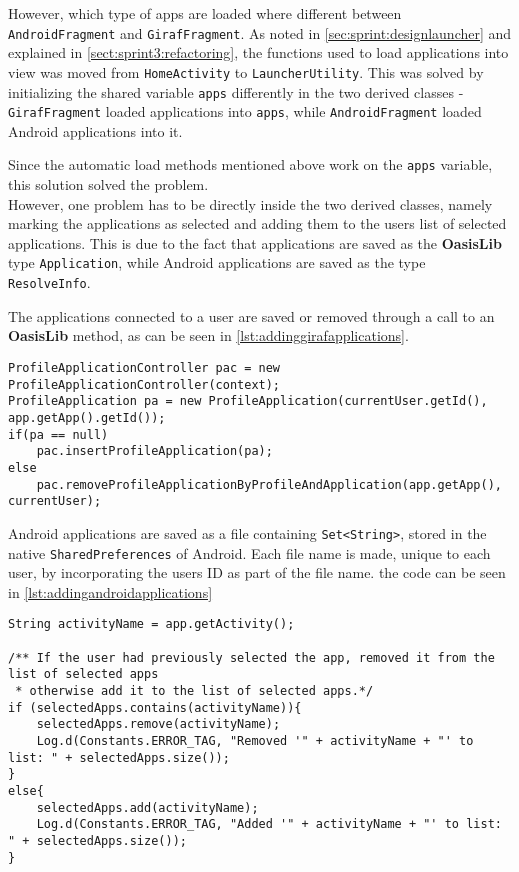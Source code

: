 However, which type of apps are loaded where different between \lstinline!AndroidFragment! and \lstinline!GirafFragment!.
As noted in \cref{sec:sprint:designlauncher} and explained in \cref{sect:sprint3:refactoring}, the functions used to load applications into view was moved from \lstinline!HomeActivity! to \lstinline!LauncherUtility!.
This was solved by initializing the shared variable \lstinline!apps! differently in the two derived classes -
\lstinline!GirafFragment! loaded \giraf applications into \lstinline!apps!, while \lstinline!AndroidFragment! loaded Android applications into it.

Since the automatic load methods mentioned above work on the \lstinline!apps! variable, this solution solved the problem. \\

However, one problem has to be directly inside the two derived classes, namely marking the applications as selected and adding them to the users list of selected applications.
This is due to the fact that \giraf applications are saved as the \textbf{OasisLib} type \lstinline!Application!, while Android applications are saved as the type \lstinline!ResolveInfo!.

The \giraf applications connected to a user are saved or removed through a call to an \textbf{OasisLib} method, as can be seen in \cref{lst:addinggirafapplications}.

\begin{lstlisting}[caption={The methods used for adding or removing a Giraf application to a user}, label={lst:addinggirafapplications}]
ProfileApplicationController pac = new ProfileApplicationController(context);
ProfileApplication pa = new ProfileApplication(currentUser.getId(), app.getApp().getId());
if(pa == null)
	pac.insertProfileApplication(pa);
else
	pac.removeProfileApplicationByProfileAndApplication(app.getApp(), currentUser);
\end{lstlisting}

Android applications are saved as a file containing \lstinline!Set<String>!, stored in the native \lstinline!SharedPreferences! of Android.
Each file name is made, unique to each user, by incorporating the users ID as part of the file name.
the code can be seen in \cref{lst:addingandroidapplications}\\

\begin{lstlisting}[caption={The methods used for adding or removing a Giraf application to a user}, label={lst:addingandroidapplications}]
String activityName = app.getActivity();

/** If the user had previously selected the app, removed it from the list of selected apps
 * otherwise add it to the list of selected apps.*/
if (selectedApps.contains(activityName)){
    selectedApps.remove(activityName);
    Log.d(Constants.ERROR_TAG, "Removed '" + activityName + "' to list: " + selectedApps.size());
}
else{
    selectedApps.add(activityName);
    Log.d(Constants.ERROR_TAG, "Added '" + activityName + "' to list: " + selectedApps.size());
}
\end{lstlisting}

